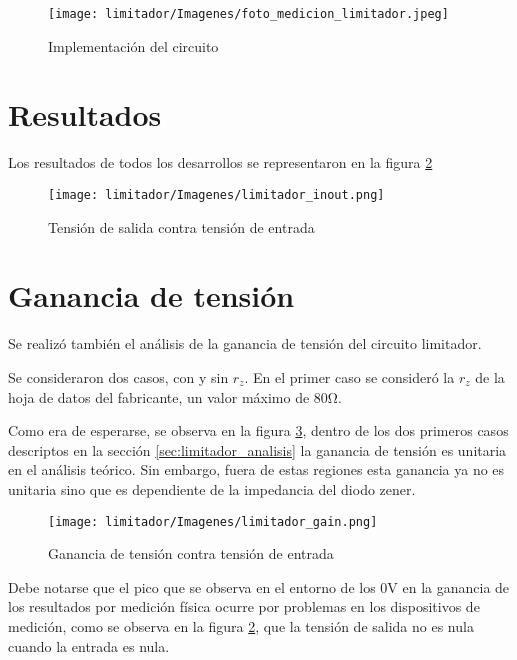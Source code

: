 \begin{figure}[H]
    \begin{center}
        \texttt{[image: limitador/Imagenes/foto\_medicion\_limitador.jpeg]}
        \caption{Implementación del circuito}
        \label{implementacion_limitador}
    \end{center}
\end{figure}

\section{Resultados}
Los resultados de todos los desarrollos se representaron en la figura \ref{fig:lim_inout}

\begin{figure}[H]
    \begin{center}
        \texttt{[image: limitador/Imagenes/limitador\_inout.png]}
        \caption{Tensión de salida contra tensión de entrada}
        \label{fig:lim_inout}
    \end{center}
\end{figure}

\section{Ganancia de tensión}
Se realizó también el análisis de la ganancia de tensión del circuito limitador. 

Se consideraron dos casos, con y sin $r_z$. En el primer caso se consideró la $r_z$ de la hoja de datos del fabricante, un valor máximo de $80 \si{\ohm}$.

Como era de esperarse, se observa en la figura \ref{fig:lim_gain}, dentro de los dos primeros casos descriptos en la sección \ref{sec:limitador_analisis} la ganancia de tensión es unitaria en el análisis teórico. Sin embargo, fuera de estas regiones esta ganancia ya no es unitaria sino que es dependiente de la impedancia del diodo zener.

\begin{figure}[H]
    \begin{center}
        \texttt{[image: limitador/Imagenes/limitador\_gain.png]}
        \caption{Ganancia de tensión contra tensión de entrada}
        \label{fig:lim_gain}
    \end{center}
\end{figure}

Debe notarse que el pico que se observa en el entorno de los $0 \si{\volt}$ en la ganancia de los resultados por medición física ocurre por problemas en los dispositivos de medición, como se observa en la figura \ref{fig:lim_inout}, que la tensión de salida no es nula cuando la entrada es nula.

